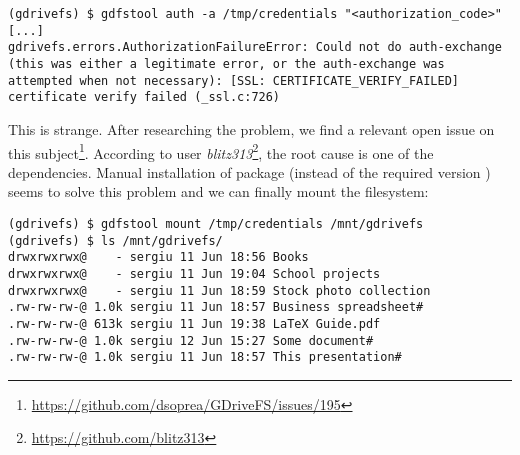 \begin{lstlisting}[caption=GDriveFS authentication error]
(gdrivefs) $ gdfstool auth -a /tmp/credentials "<authorization_code>"
[...]
gdrivefs.errors.AuthorizationFailureError: Could not do auth-exchange (this was either a legitimate error, or the auth-exchange was attempted when not necessary): [SSL: CERTIFICATE_VERIFY_FAILED] certificate verify failed (_ssl.c:726)
\end{lstlisting}

This is strange. After researching the problem, we find a relevant open issue on this subject\footnote{\url{https://github.com/dsoprea/GDriveFS/issues/195}}. According to user \emph{blitz313}\footnote{\url{https://github.com/blitz313}}, the root cause is one of the dependencies. Manual installation of package  (instead of the required version ) seems to solve this problem and we can finally mount the filesystem:

\begin{lstlisting}[caption=GDriveFS filesystem mount]
(gdrivefs) $ gdfstool mount /tmp/credentials /mnt/gdrivefs
(gdrivefs) $ ls /mnt/gdrivefs/
drwxrwxrwx@    - sergiu 11 Jun 18:56 Books
drwxrwxrwx@    - sergiu 11 Jun 19:04 School projects
drwxrwxrwx@    - sergiu 11 Jun 18:59 Stock photo collection
.rw-rw-rw-@ 1.0k sergiu 11 Jun 18:57 Business spreadsheet#
.rw-rw-rw-@ 613k sergiu 11 Jun 19:38 LaTeX Guide.pdf
.rw-rw-rw-@ 1.0k sergiu 12 Jun 15:27 Some document#
.rw-rw-rw-@ 1.0k sergiu 11 Jun 18:57 This presentation#
\end{lstlisting}

